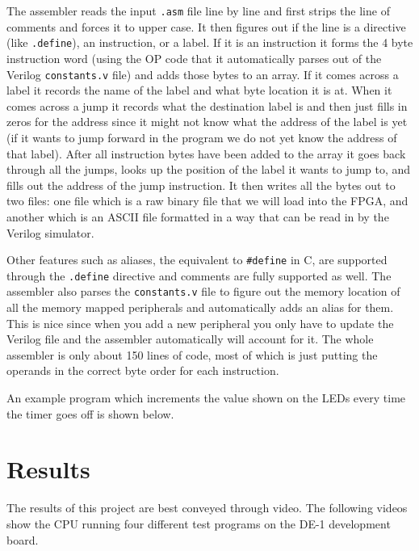 \documentclass[10pt]{article}
\begin{document}
    The assembler reads the input \texttt{.asm} file line by line and first
    strips the line of comments and forces it to upper case. It then figures
    out if the line is a directive (like \texttt{.define}), an instruction, or
    a label. If it is an instruction it forms the 4 byte instruction word
    (using the OP code that it automatically parses out of the Verilog
    \texttt{constants.v} file) and adds those bytes to an array. If it comes
    across a label it records the name of the label and what byte location it
    is at. When it comes across a jump it records what the destination label is
    and then just fills in zeros for the address since it might not know what
    the address of the label is yet (if it wants to jump forward in the program
    we do not yet know the address of that label).  After all instruction bytes
    have been added to the array it goes back through all the jumps, looks up
    the position of the label it wants to jump to, and fills out the address of
    the jump instruction. It then writes all the bytes out to two files: one
    file which is a raw binary file that we will load into the FPGA, and
    another which is an ASCII file formatted in a way that can be read in by
    the Verilog simulator.

    Other features such as aliases, the equivalent to \texttt{\#define} in C,
    are supported through the \texttt{.define} directive and comments are fully
    supported as well. The assembler also parses the \texttt{constants.v} file
    to figure out the memory location of all the memory mapped peripherals and
    automatically adds an alias for them. This is nice since when you add a new
    peripheral you only have to update the Verilog file and the assembler
    automatically will account for it. The whole assembler is only about 150
    lines of code, most of which is just putting the operands in the correct
    byte order for each instruction.

    An example program which increments the value shown on the  LEDs every time
    the timer goes off is shown below.

    


\newpage
\section{Results}

    The results of this project are best conveyed through video. The following
    videos show the CPU running four different test programs on the DE-1
    development board.
\end{document}
